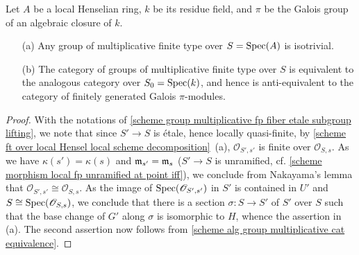 \begin{corollary}\label{scheme group multiplicative ft over local Hensel isotrivial prop}
Let $A$ be a local Henselian ring, $k$ be its residue field, and $\pi$ be the Galois group of an algebraic closure of $k$.
\begin{enumerate}
    \item[(a)] Any group of multiplicative finite type over $S=\mathrm{Spec}(A)$ is isotrivial.
    \item[(b)] The category of groups of multiplicative finite type over $S$ is equivalent to the analogous category over $S_0=\mathrm{Spec}(k)$, and hence is anti-equivalent to the category of finitely generated Galois $\pi$-modules.  
\end{enumerate}
\end{corollary}
\begin{proof}
With the notations of \cref{scheme group multiplicative fp fiber etale subgroup lifting}, we note that since $S'\to S$ is \'etale, hence locally quasi-finite, by \cref{scheme ft over local Hensel local scheme decomposition}~(a), $\mathscr{O}_{S',s'}$ is finite over $\mathscr{O}_{S,s}$. As we have $\kappa(s')=\kappa(s)$ and $\mathfrak{m}_{s'}=\mathfrak{m}_s$ ($S'\to S$ is unramified, cf. \cref{scheme morphism local fp unramified at point iff}), we conclude from Nakayama's lemma that $\mathscr{O}_{S',s'}\cong\mathscr{O}_{S,s}$. As the image of $\mathrm{Spec}(\mathscr{O}_{S',s'})$ in $S'$ is contained in $U'$ and $S\cong\mathrm{Spec}(\mathscr{O}_{S,s})$, we conclude that there is a section $\sigma:S\to S'$ of $S'$ over $S$ such that the base change of $G'$ along $\sigma$ is isomorphic to $H$, whence the assertion in (a). The second assertion now follows from \cref{scheme alg group multiplicative cat equivalence}.
\end{proof}


